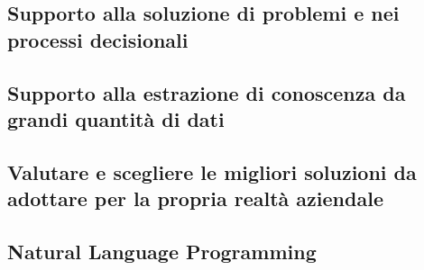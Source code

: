     \subsection{Supporto alla soluzione di problemi e nei processi decisionali}
    
    \subsection{Supporto alla estrazione di conoscenza da grandi quantità di dati}
    
    \subsection{Valutare e scegliere le migliori soluzioni da adottare per la propria realtà aziendale}
    
    \subsection{Natural Language Programming}
